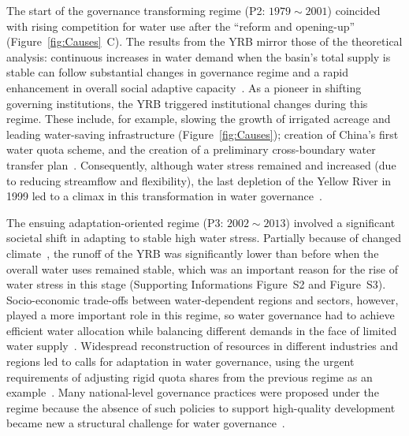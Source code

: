 The start of the governance transforming regime (P2: $1979 \sim 2001$) coincided with rising competition for water use after the ``reform and opening-up'' (Figure~\ref{fig:Causes}~C).
The results from the YRB mirror those of the theoretical analysis: continuous increases in water demand when the basin's total supply is stable can follow substantial changes in governance regime and a rapid enhancement in overall social adaptive capacity~\cite{loch2020}.
As a pioneer in shifting governing institutions, the YRB triggered institutional changes during this regime. These include, for example, slowing the growth of irrigated acreage and leading water-saving infrastructure (Figure~\ref{fig:Causes}); creation of China's first water quota scheme, and the creation of a preliminary cross-boundary water transfer plan~\cite{wang2019e,long2020,nickum2021}.
Consequently, although water stress remained and increased (due to reducing streamflow and flexibility), the last depletion of the Yellow River in 1999 led to a climax in this transformation in water governance~\cite{wang2019e}.

The ensuing adaptation-oriented regime (P3: $2002 \sim 2013$) involved a significant societal shift in adapting to stable high water stress.
Partially because of changed climate~\cite{han2023,liu2020c}, the runoff of the YRB was significantly lower than before when the overall water uses remained stable, which was an important reason for the rise of water stress in this stage (Supporting Informations Figure~S2 and Figure~S3).
Socio-economic trade-offs between water-dependent regions and sectors, however, played a more important role in this regime, so water governance had to achieve efficient water allocation while balancing different demands in the face of limited water supply~\cite{dalin2015,song2022}.
Widespread reconstruction of resources in different industries and regions led to calls for adaptation in water governance, using the urgent requirements of adjusting rigid quota shares from the previous regime as an example~\cite{wang2019e}.
Many national-level governance practices were proposed under the regime because the absence of such policies to support high-quality development became new a structural challenge for water governance~\cite{konar2019}.

